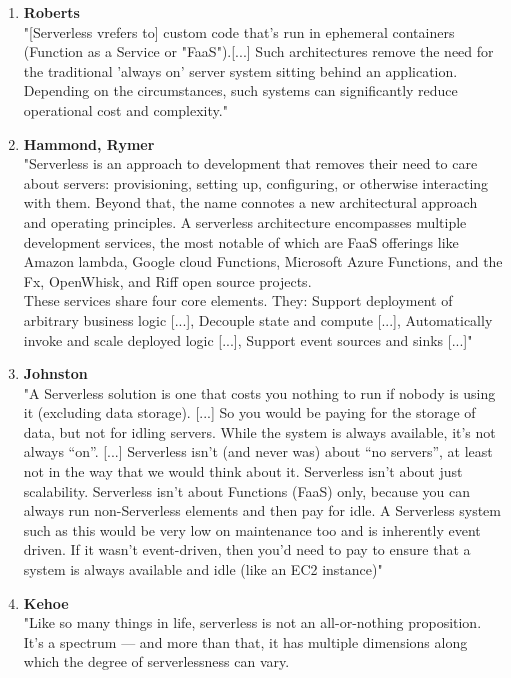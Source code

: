 \begin{enumerate}
    \item \textbf{Roberts}\\
        "[Serverless vrefers to] custom code that's run in ephemeral containers (Function as a Service or "FaaS").[...] Such architectures remove the need for the traditional 'always on' server system sitting behind an application. Depending on the circumstances, such systems can significantly reduce operational cost and complexity."\autocite{Roberts2016ServerlessArchitectures}
    \item \textbf{Hammond, Rymer} \\
        "Serverless is an approach to development that removes their need to care about servers: provisioning, setting up, configuring, or otherwise interacting with them. Beyond that, the name connotes a new architectural approach and operating principles. A serverless architecture encompasses multiple development services, the most notable of which are FaaS offerings like Amazon lambda, Google cloud Functions, Microsoft Azure Functions, and the Fx, OpenWhisk, and Riff open source projects.\\
        These services share four core elements. They: Support deployment of arbitrary business logic [...], Decouple state and compute [...], Automatically invoke and scale deployed logic [...], Support event sources and sinks [...]"\autocite{Hammond2018DemystifyingComputing}
    \item \textbf{Johnston}\\
        "A Serverless solution is one that costs you nothing to run if nobody is using it (excluding data storage). [...] So you would be paying for the storage of data, but not for idling servers.
        While the system is always available, it’s not always “on”.
        [...]
        Serverless isn’t (and never was) about “no servers”, at least not in the way that we would think about it.
        Serverless isn’t about just scalability.
        Serverless isn’t about Functions (FaaS) only, because you can always run non-Serverless elements and then pay for idle.
        A Serverless system such as this would be very low on maintenance too and is inherently event driven. If it wasn’t event-driven, then you’d need to pay to ensure that a system is always available and idle (like an EC2 instance)"\autocite{Johnston2017AServerless}
    \item \textbf{Kehoe}\\
        "Like so many things in life, serverless is not an all-or-nothing proposition. It’s a spectrum — and more than that, it has multiple dimensions along which the degree of serverlessness can vary.

\end{enumerate}
